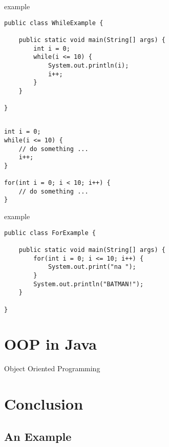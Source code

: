 \begin{frame}[fragile]{ example}
\begin{lstlisting}
public class WhileExample {

    public static void main(String[] args) {
        int i = 0;
        while(i <= 10) {
            System.out.println(i);
            i++;
        }
    }
    
}\end{lstlisting}
\end{frame}

\subsection{}
\begin{frame}[fragile]{}
\begin{lstlisting}
int i = 0;
while(i <= 10) {
    // do something ... 
    i++;
}

for(int i = 0; i < 10; i++) {
    // do something ... 
}\end{lstlisting}
\end{frame}

\begin{frame}[fragile]{ example}
\begin{lstlisting}
public class ForExample {

    public static void main(String[] args) {
        for(int i = 0; i <= 10; i++) {
            System.out.print("na ");
        }
        System.out.println("BATMAN!");
    }
    
}\end{lstlisting}
\end{frame}


\section{OOP in Java}

\begin{frame}{}
    \begin{center}
        {\huge Object Oriented Programming}
    \end{center}
\end{frame}

\section{Conclusion}
\subsection{An Example}

